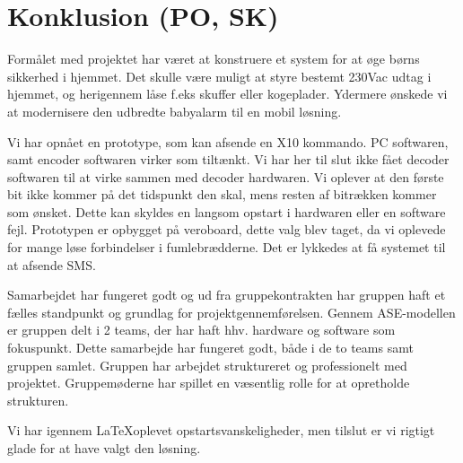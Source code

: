 \chapter{Konklusion (PO, SK)}

Formålet med projektet har været at konstruere et system for at øge børns sikkerhed i hjemmet. Det skulle være muligt at styre bestemt 230Vac udtag i hjemmet, og herigennem låse f.eks skuffer eller kogeplader. Ydermere ønskede vi at modernisere den udbredte babyalarm til en mobil løsning. 

Vi har opnået en prototype, som kan afsende en X10 kommando. PC softwaren, samt encoder softwaren virker som tiltænkt. Vi har her til slut ikke fået decoder softwaren til at virke sammen med decoder hardwaren. Vi oplever at den første bit ikke kommer på det tidspunkt den skal, mens resten af bitrækken kommer som ønsket. Dette kan skyldes en langsom opstart i hardwaren eller en software fejl. Prototypen er opbygget på veroboard, dette valg blev taget, da vi oplevede for mange løse forbindelser i fumlebrædderne. 
Det er lykkedes at få systemet til at afsende SMS.  

Samarbejdet har fungeret godt og ud fra gruppekontrakten har gruppen haft et fælles standpunkt og grundlag for projektgennemførelsen. Gennem ASE-modellen er gruppen delt i 2 teams, der har haft hhv. hardware og software som fokuspunkt. Dette samarbejde har fungeret godt, både i de to teams samt gruppen samlet. Gruppen har arbejdet struktureret og professionelt med projektet. Gruppemøderne har spillet en væsentlig rolle for at opretholde strukturen.  

Vi har igennem \LaTeX  oplevet opstartsvanskeligheder, men tilslut er vi rigtigt glade for at have valgt den løsning. 
